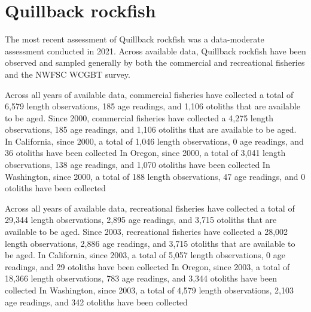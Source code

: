 \documentclass[11pt,
  english,
  letterpaper,
]{article}
\begin{document}

\hypertarget{quillback-rockfish}{%
\section{Quillback rockfish}\label{quillback-rockfish}}

\leavevmode\tagmcend\tagstructend


The most recent assessment of Quillback rockfish was a data-moderate assessment conducted in 2021. Across available data, Quillback rockfish have been observed and sampled generally by both the commercial and recreational fisheries and the NWFSC WCGBT survey.

\leavevmode\tagmcend\tagstructend\par


Across all years of available data, commercial fisheries have collected a total of 6,579 length observations, 185 age readings, and 1,106 otoliths that are available to be aged. Since 2000, commercial fisheries have collected a 4,275 length observations, 185 age readings, and 1,106 otoliths that are available to be aged. In California, since 2000, a total of 1,046 length observations, 0 age readings, and 36 otoliths have been collected In Oregon, since 2000, a total of 3,041 length observations, 138 age readings, and 1,070 otoliths have been collected In Washington, since 2000, a total of 188 length observations, 47 age readings, and 0 otoliths have been collected

\leavevmode\tagmcend\tagstructend\par


Across all years of available data, recreational fisheries have collected a total of 29,344 length observations, 2,895 age readings, and 3,715 otoliths that are available to be aged. Since 2003, recreational fisheries have collected a 28,002 length observations, 2,886 age readings, and 3,715 otoliths that are available to be aged. In California, since 2003, a total of 5,057 length observations, 0 age readings, and 29 otoliths have been collected In Oregon, since 2003, a total of 18,366 length observations, 783 age readings, and 3,344 otoliths have been collected In Washington, since 2003, a total of 4,579 length observations, 2,103 age readings, and 342 otoliths have been collected
\end{document}

